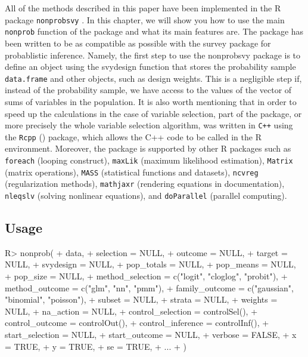 \documentclass[
]{jss}
\begin{document}
All of the methods described in this paper have been implemented in the
R package \texttt{nonprobsvy} \citet{nonprobsvy}. In this chapter, we
will show you how to use the main \texttt{nonprob} function of the
package and what its main features are. The package has been written to
be as compatible as possible with the survey package for probablistic
inference. Namely, the first step to use the nonprobsvy package is to
define an object using the svydesign function that stores the
probability sample \texttt{data.frame} and other objects, such as design
weights. This is a negligible step if, instead of the probability
sample, we have access to the values of the vector of sums of variables
in the population. It is also worth mentioning that in order to speed up
the calculations in the case of variable selection, part of the package,
or more precisely the whole variable selection algorithm, was written in
\texttt{C++} using the \texttt{Rcpp} (\citet{Rcpp}) package, which
allows the C++ code to be called in the R environment. Moreover, the
package is supported by other R packages such as \texttt{foreach}
\citet{foreach} (looping construct), \texttt{maxLik} \citet{maxLik}
(maximum likelihood estimation), \texttt{Matrix} \citet{Matrix} (matrix
operations), \texttt{MASS} \citet{MASS} (statistical functions and
datasets), \texttt{ncvreg} \citet{ncvreg} (regularization methods),
\texttt{mathjaxr} \citet{mathjaxr} (rendering equations in
documentation), \texttt{nleqslv} \citet{nleqslv} (solving nonlinear
equations), and \texttt{doParallel} \citet{doParallel} (parallel
computing).

\hypertarget{usage}{%
\subsection{Usage}\label{usage}}

\begin{CodeChunk}
\begin{CodeInput}
R> nonprob(
+   data,
+   selection = NULL,
+   outcome = NULL,
+   target = NULL,
+   svydesign = NULL,
+   pop_totals = NULL,
+   pop_means = NULL,
+   pop_size = NULL,
+   method_selection = c("logit", "cloglog", "probit"),
+   method_outcome = c("glm", "nn", "pmm"),
+   family_outcome = c("gaussian", "binomial", "poisson"),
+   subset = NULL,
+   strata = NULL,
+   weights = NULL,
+   na_action = NULL,
+   control_selection = controlSel(),
+   control_outcome = controlOut(),
+   control_inference = controlInf(),
+   start_selection = NULL,
+   start_outcome = NULL,
+   verbose = FALSE,
+   x = TRUE,
+   y = TRUE,
+   se = TRUE,
+   ...
+ )
\end{CodeInput}
\end{CodeChunk}
\end{document}
